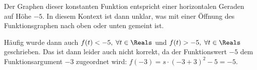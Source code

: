 \documentclass[12pt]{article}
\begin{document}
Der Graphen dieser konstanten Funktion entspricht einer horizontalen Geraden auf Höhe $-5$. In diesem Kontext ist dann unklar, was mit einer Öffnung des Funktionsgraphen nach oben oder unten gemeint ist.


Häufig wurde dann auch $f(t) < -5, \; \forall t \in \Reals$ und $f(t) > -5, \; \forall t \in \Reals$ geschrieben. Das ist dann leider auch nicht korrekt, da der Funktionswert $-5$ dem Funktionsargument $-3$ zugeordnet wird: $f(-3) = s\cdot (-3+3)^2 - 5 = -5$.

\end{document}
